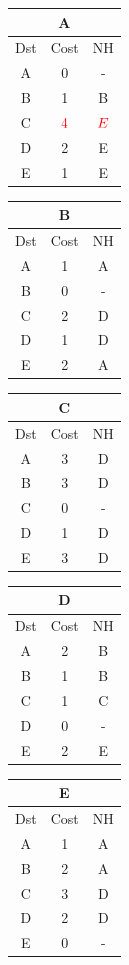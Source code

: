 \documentclass[10pt]{article}
\begin{document}
	\begin{table}[h!]
		\begin{tabular}{|c||c||c|}
 			\hline
	 		\multicolumn{3}{|c|}{A} \\
 			\hline
 			Dst & Cost & NH\\
 			\hline
 			A & 0 & - \\
 			B & 1 & B \\
 			C & $\color{red} 4$ & $\color{red} E$ \\
 			D & 2 & E \\
 			E & 1 & E \\
 			\hline
		\end{tabular}
		\begin{tabular}{|c||c||c|}
 			\hline
	 		\multicolumn{3}{|c|}{B} \\
 			\hline
 			Dst & Cost & NH\\
 			\hline
 			A & 1 & A \\
 			B & 0 & - \\
 			C & 2 & D \\
 			D & 1 & D \\
 			E & 2 & A \\
 			\hline
		\end{tabular}
		\begin{tabular}{|c||c||c|}
 			\hline
	 		\multicolumn{3}{|c|}{C} \\
 			\hline
 			Dst & Cost & NH\\
 			\hline
 			A & 3 & D \\
 			B &3 & D \\
 			C & 0 & - \\
 			D & 1 & D \\
 			E & 3 & D \\
 			\hline
		\end{tabular}
		\begin{tabular}{|c||c||c|}
 			\hline
	 		\multicolumn{3}{|c|}{D} \\
 			\hline
 			Dst & Cost & NH\\
 			\hline
 			A & 2 & B \\
 			B & 1 & B \\
 			C & 1 & C \\
 			D & 0 & - \\
 			E & 2 & E \\
 			\hline
		\end{tabular}
		\begin{tabular}{|c||c||c|}
 			\hline
	 		\multicolumn{3}{|c|}{E} \\
 			\hline
 			Dst & Cost & NH\\
 			\hline
 			A & 1 & A \\
 			B & 2 & A \\
 			C & 3 & D \\
 			D & 2 & D \\
 			E & 0 & - \\
 			\hline
		\end{tabular}
	\end{table}
\end{document}
